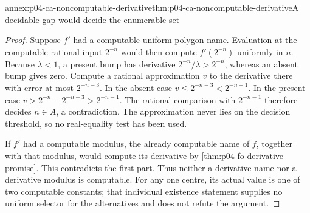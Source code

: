 \begin{annexitem}{annex:p04-ca-noncomputable-derivative}{thm:p04-ca-noncomputable-derivative}{A decidable gap would decide the enumerable set}
\begin{proof}
Suppose \(f'\) had a computable uniform polygon name.
Evaluation at the computable rational input \(2^{-n}\) would then
compute \(f'(2^{-n})\) uniformly in \(n\).
Because \(\lambda<1\), a present bump has derivative
\(2^{-n}/\lambda>2^{-n}\), whereas an absent bump gives zero.
Compute a rational approximation \(v\) to the derivative there with
error at most \(2^{-n-3}\).
In the absent case \(v\leq2^{-n-3}<2^{-n-1}\).
In the present case
\(v>2^{-n}-2^{-n-3}>2^{-n-1}\).
The rational comparison with \(2^{-n-1}\) therefore decides
\(n\in A\), a contradiction. The approximation never lies on
the decision threshold, so no real-equality test has been used.

If \(f'\) had a computable modulus, the already computable name of
\(f\), together with that modulus, would compute its derivative by
\cref{thm:p04-fo-derivative-promise}. This contradicts the first part.
Thus neither a derivative name nor a derivative modulus is computable.
For any one centre, its actual value is one of two computable constants;
that individual existence statement supplies no uniform selector for
the alternatives and does not refute the argument.
\end{proof}
\end{annexitem}

